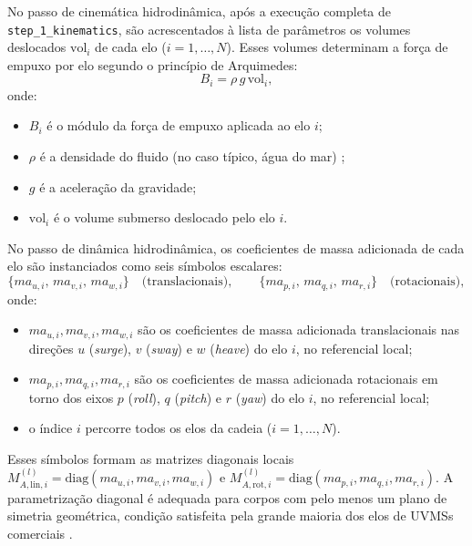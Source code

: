No passo de cinemática hidrodinâmica, após a execução completa de \texttt{step\_1\_kinematics}, são acrescentados à lista de parâmetros os volumes deslocados $\text{vol}_i$ de cada elo ($i = 1, \ldots, N$). Esses volumes determinam a força de empuxo por elo segundo o princípio de Arquimedes:
\begin{equation}
    B_i = \rho\, g\, \text{vol}_i,
    \label{eq:empuxo_por_elo}
\end{equation}
onde:
\begin{itemize}
    \item $B_i$ é o módulo da força de empuxo aplicada ao elo $i$;
    \item $\rho$ é a densidade do fluido (no caso típico, água do mar) \cite{newman1977marine};
    \item $g$ é a aceleração da gravidade;
    \item $\text{vol}_i$ é o volume submerso deslocado pelo elo $i$.
\end{itemize}

No passo de dinâmica hidrodinâmica, os coeficientes de massa adicionada de cada elo são instanciados como seis símbolos escalares:
\begin{equation}
    \{ma_{u,i},\, ma_{v,i},\, ma_{w,i}\} \quad \text{(translacionais)}, \qquad
    \{ma_{p,i},\, ma_{q,i},\, ma_{r,i}\} \quad \text{(rotacionais)},
    \label{eq:MA_syms}
\end{equation}
onde:
\begin{itemize}
    \item $ma_{u,i}, ma_{v,i}, ma_{w,i}$ são os coeficientes de massa adicionada translacionais nas direções $u$ (\textit{surge}), $v$ (\textit{sway}) e $w$ (\textit{heave}) do elo $i$, no referencial local;
    \item $ma_{p,i}, ma_{q,i}, ma_{r,i}$ são os coeficientes de massa adicionada rotacionais em torno dos eixos $p$ (\textit{roll}), $q$ (\textit{pitch}) e $r$ (\textit{yaw}) do elo $i$, no referencial local;
    \item o índice $i$ percorre todos os elos da cadeia ($i = 1, \ldots, N$).
\end{itemize}

Esses símbolos formam as matrizes diagonais locais $M_{A,\text{lin},i}^{(l)} = \text{diag}(ma_{u,i}, ma_{v,i}, ma_{w,i})$ e $M_{A,\text{rot},i}^{(l)} = \text{diag}(ma_{p,i}, ma_{q,i}, ma_{r,i})$. A parametrização diagonal é adequada para corpos com pelo menos um plano de simetria geométrica, condição satisfeita pela grande maioria dos elos de UVMSs comerciais \cite{fossen2011handbook}.

